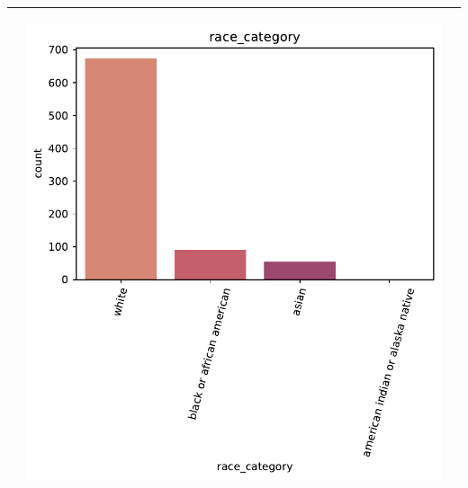 \begin{table}[!htb]
\begin{threeparttable}
\begin{tabular}{p{2.5cm} p{7cm} p{6.5cm}}
			& \begin{center}\includegraphics[width=1\linewidth]{NOTEBOOK/IMAGENES_DESCRIPTIVAS/38_race_category}\end{center}
			\\ \hline
			
		\end{tabular}
	\end{threeparttable}
\end{table}



